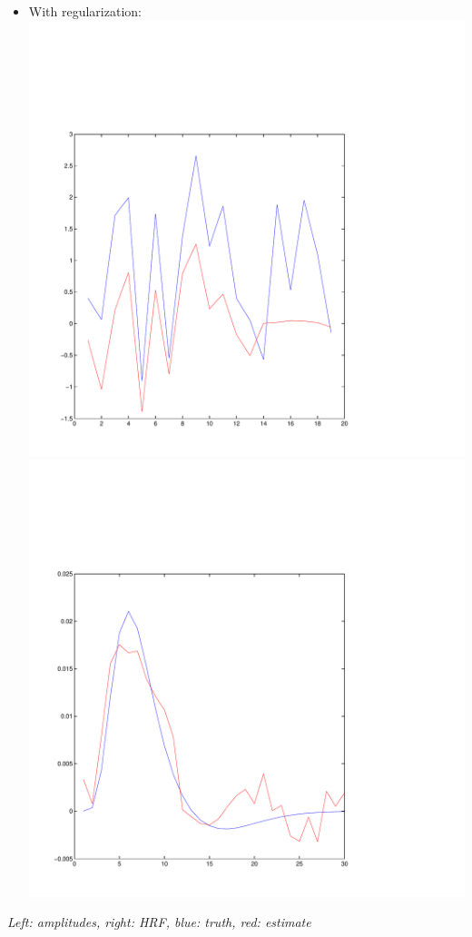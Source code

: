 \documentclass{beamer}
\begin{document}
\begin{frame}
\begin{itemize}
\item With regularization:
\includegraphics[scale=0.1]{ex2_test2a.pdf}
\includegraphics[scale=0.1]{ex2_test2b.pdf}
\end{itemize}
\emph{Left: amplitudes, right: HRF, blue: truth, red: estimate}
\end{frame}
\end{document}
